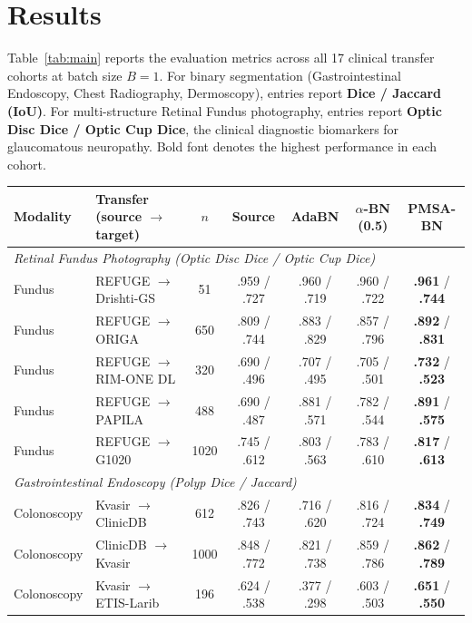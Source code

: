 \documentclass[11pt,a4paper]{article}
\begin{document}
\section{Results}
\label{sec:results}

Table~\ref{tab:main} reports the evaluation metrics across all 17 clinical transfer cohorts at batch size $B=1$. For binary segmentation (Gastrointestinal Endoscopy, Chest Radiography, Dermoscopy), entries report \textbf{Dice / Jaccard (IoU)}. For multi-structure Retinal Fundus photography, entries report \textbf{Optic Disc Dice / Optic Cup Dice}, the clinical diagnostic biomarkers for glaucomatous neuropathy. Bold font denotes the highest performance in each cohort.

\begin{table}[h]
\centering
\small
\begin{tabularx}{\linewidth}{@{}l >{\raggedright\arraybackslash}X c c c c c@{}}
\toprule
Modality & Transfer (source $\to$ target) & $n$ & Source & AdaBN & $\alpha$-BN (0.5) & PMSA-BN \\
\midrule
\multicolumn{7}{l}{\textit{Retinal Fundus Photography (Optic Disc Dice / Optic Cup Dice)}} \\
Fundus & REFUGE $\to$ Drishti-GS & 51 & .959 / .727 & .960 / .719 & .960 / .722 & \textbf{.961} / \textbf{.744} \\
Fundus & REFUGE $\to$ ORIGA & 650 & .809 / .744 & .883 / .829 & .857 / .796 & \textbf{.892} / \textbf{.831} \\
Fundus & REFUGE $\to$ RIM-ONE DL & 320 & .690 / .496 & .707 / .495 & .705 / .501 & \textbf{.732} / \textbf{.523} \\
Fundus & REFUGE $\to$ PAPILA & 488 & .690 / .487 & .881 / .571 & .782 / .544 & \textbf{.891} / \textbf{.575} \\
Fundus & REFUGE $\to$ G1020 & 1020 & .745 / .612 & .803 / .563 & .783 / .610 & \textbf{.817} / \textbf{.613} \\
\midrule
\multicolumn{7}{l}{\textit{Gastrointestinal Endoscopy (Polyp Dice / Jaccard)}} \\
Colonoscopy & Kvasir $\to$ ClinicDB & 612 & .826 / .743 & .716 / .620 & .816 / .724 & \textbf{.834} / \textbf{.749} \\
Colonoscopy & ClinicDB $\to$ Kvasir & 1000 & .848 / .772 & .821 / .738 & .859 / .786 & \textbf{.862} / \textbf{.789} \\
Colonoscopy & Kvasir $\to$ ETIS-Larib & 196 & .624 / .538 & .377 / .298 & .603 / .503 & \textbf{.651} / \textbf{.550} \\

\end{tabularx}
\end{table}
\end{document}
